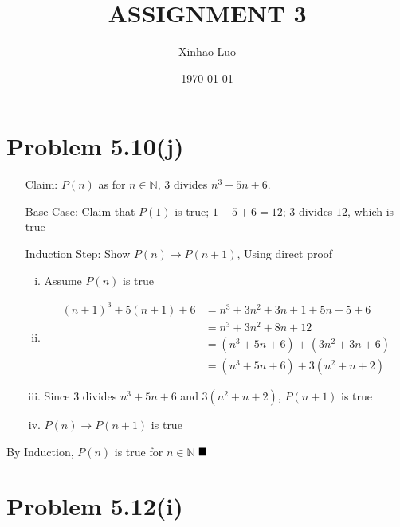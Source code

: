 \documentclass{article}
\title{\bf \Large ASSIGNMENT 3}
\author{Xinhao Luo}
\date{\today}
\def\math#1{$#1$}
\begin{document}
\maketitle
\medskip

\section{Problem 5.10(j)}

\begin{itemize}
    \item [Claim: ] \math{P(n)} as for \math{n \in \mathbb{N}}, 3 divides \math{n^3 + 5n + 6}.
    \item [Base Case: ] Claim that \math{P(1)} is true; \math{1 + 5 + 6 = 12}; \math{3} divides \math{12}, which is true
    \item [Induction Step: ] Show \math{P(n) \to P(n+1)}, Using direct proof 
        \begin{enumerate}[i)]
            \item Assume \math{P(n)} is true
            \item \begin{equation}
                        \begin{split}
                            (n+1)^3 + 5(n+1) + 6 & = n^3 + 3n^2 + 3n + 1 + 5n + 5 + 6 \\
                            & = n^3 + 3n^2 + 8n + 12 \\
                            & = (n^3 + 5n + 6) + (3n^2 + 3n + 6) \\
                            & = (n^3 + 5n + 6) + 3(n^2 + n + 2)
                        \end{split}
                    \end{equation}
            \item Since 3 divides \math{n^3 + 5n + 6} and \math{3(n^2 + n + 2)}, \math{P(n+1)} is true
            \item \math{P(n) \to P(n+1)} is true
    \end{enumerate}
\end{itemize}

By Induction, \math{P(n)} is true for \math{n \in \mathbb{N}} \math{\hfill{\blacksquare}}

\section{Problem 5.12(i)}
\end{document}
